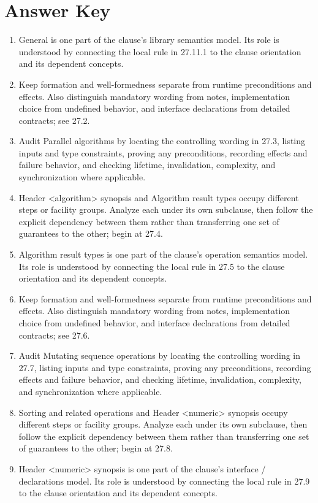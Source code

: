 \documentclass[11pt,letterpaper]{article}
\begin{document}
\clearpage\section{Answer Key}
\begin{enumerate}
\item General is one part of the clause's library semantics model. Its role is understood by connecting the local rule in 27.11.1 to the clause orientation and its dependent concepts.
\item Keep formation and well-formedness separate from runtime preconditions and effects. Also distinguish mandatory wording from notes, implementation choice from undefined behavior, and interface declarations from detailed contracts; see 27.2.
\item Audit Parallel algorithms by locating the controlling wording in 27.3, listing inputs and type constraints, proving any preconditions, recording effects and failure behavior, and checking lifetime, invalidation, complexity, and synchronization where applicable.
\item Header <algorithm> synopsis and Algorithm result types occupy different steps or facility groups. Analyze each under its own subclause, then follow the explicit dependency between them rather than transferring one set of guarantees to the other; begin at 27.4.
\item Algorithm result types is one part of the clause's operation semantics model. Its role is understood by connecting the local rule in 27.5 to the clause orientation and its dependent concepts.
\item Keep formation and well-formedness separate from runtime preconditions and effects. Also distinguish mandatory wording from notes, implementation choice from undefined behavior, and interface declarations from detailed contracts; see 27.6.
\item Audit Mutating sequence operations by locating the controlling wording in 27.7, listing inputs and type constraints, proving any preconditions, recording effects and failure behavior, and checking lifetime, invalidation, complexity, and synchronization where applicable.
\item Sorting and related operations and Header <numeric> synopsis occupy different steps or facility groups. Analyze each under its own subclause, then follow the explicit dependency between them rather than transferring one set of guarantees to the other; begin at 27.8.
\item Header <numeric> synopsis is one part of the clause's interface / declarations model. Its role is understood by connecting the local rule in 27.9 to the clause orientation and its dependent concepts.

\end{enumerate}
\end{document}
